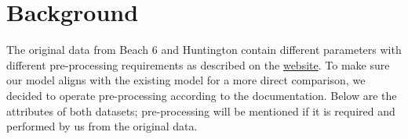 
\section{Background}
\label{sec:background}

The original data from Beach 6 and Huntington contain different parameters with different pre-processing requirements as described on the \href{https://www.sciencebase.gov/catalog/file/get/5fe22dead34e30b9123f09b5?f=__disk__42%2F04%2F43%2F420443e837a6255bc88b7c942550014ba2c9b1a6&transform=1&allowOpen=true}{website}. To make sure our model aligns with the existing model for a more direct comparison, we decided to operate pre-processing according to the documentation. Below are the attributes of both datasets; pre-processing will be mentioned if it is required and performed by us from the original data.

